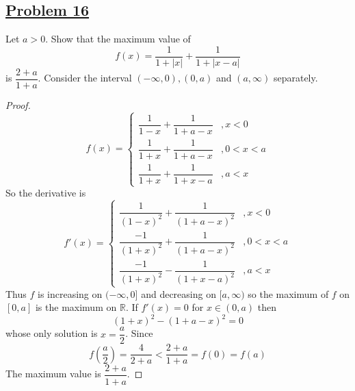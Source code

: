 \documentclass[10pt,letterpaper]{article}
\begin{document}
	\subsection*{{\color{purple}\underline{Problem 16}}}
	Let $a > 0$. Show that the maximum value of 
	$$f(x) = \dfrac{1}{1 + |x|} + \dfrac{1}{1 + |x - a|}$$
	is $\dfrac{2 + a}{1 + a}$. Consider the interval $(-\infty, 0), (0, a)$ and $(a, \infty)$
	separately.
	\begin{proof}
$$f(x) =
\begin{cases}
	\dfrac{1}{1 - x} + \dfrac{1}{1 + a - x} &, x < 0 \\
	\dfrac{1}{1 + x} + \dfrac{1}{1 + a - x} &, 0 < x < a \\
	\dfrac{1}{1 + x} + \dfrac{1}{1 + x - a} &, a < x
\end{cases}
$$	
So the derivative is
$$f'(x) =
\begin{cases}
	\dfrac{1}{(1-x)^2}    + \dfrac{1}{(1 + a - x)^2} &, x < 0 \\
	\dfrac{-1}{(1 + x)^2} + \dfrac{1}{(1 + a - x)^2} &, 0 < x < a \\
	\dfrac{-1}{(1 + x)^2} - \dfrac{1}{(1 + x - a)^2} &, a < x
\end{cases}
$$
	Thus $f$ is increasing on $(-\infty, 0]$ and decreasing on $[a, \infty)$ so the maximum 
	of $f$ on $[0, a]$ is the maximum on $\mathbb{R}$. If $f'(x) = 0$ for $x \in (0, a)$ then
	$$(1 + x)^2 - (1 + a - x)^2 = 0$$
	whose only solution is $x = \dfrac{a}{2}$. Since
	$$f(\dfrac{a}{2}) = \dfrac{4}{2 + a} < \dfrac{2 + a}{1 + a} = f(0) = f(a)$$
	The maximum value is $\dfrac{2 + a}{1 + a}$.
	\end{proof}
	
\end{document}
